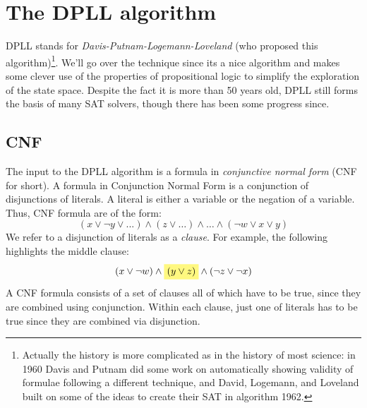 \section{The DPLL algorithm}

DPLL stands for \emph{Davis-Putnam-Logemann-Loveland} (who proposed
this algorithm)\footnote{Actually the history is more complicated as
  in the history of most science: in 1960 Davis and Putnam did some
  work on automatically showing validity of formulae following a
  different technique, and David, Logemann, and Loveland built on some
  of the ideas to create their SAT in algorithm 1962.}. We'll go over
the technique since its a nice algorithm and makes some clever use of
the properties of propositional logic to simplify the exploration of
the state space. Despite the fact it is more than 50 years old, DPLL
still forms the basis of many SAT solvers, though there has been
some progress since.

\subsection{CNF}

The input to the DPLL algorithm is a formula in \emph{conjunctive
  normal form} (CNF for short).  A formula in Conjunction Normal
Form is a conjunction of disjunctions of literals. A literal is
either a variable or the negation of a variable. Thus, CNF formula are
of the form:
%
\begin{equation*}
  (\textit{x} \vee \neg \textit{y} \vee ...) \wedge
  (\textit{z} \vee \ldots) \wedge \ldots \wedge
  (\neg \textit{w} \vee \textit{x} \vee \textit{y})
\end{equation*}
%
We refer to a disjunction of literals as a \emph{clause}.
For example, the following highlights the middle clause:
%
\begin{equation}
(x \vee \neg w) \wedge {\highlight{(y \vee z)}} \wedge (\neg z \vee \neg x)
\end{equation}
%
A CNF formula consists of a set of clauses all of which have to be
true, since they are combined using conjunction. Within each clause,
just one of literals has to be true since they are combined via
disjunction.

